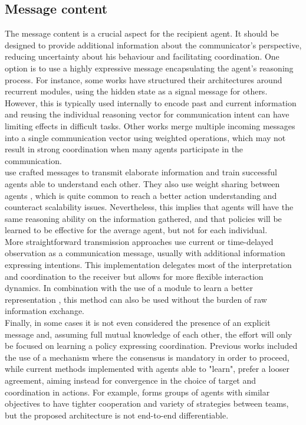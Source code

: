 \documentclass[a4paper,singleside,12pt]{report} %
\begin{document}
\subsection{Message content}\label{message-content}
The message content is a crucial aspect for the recipient agent. It should be designed to provide additional information about the communicator's perspective, reducing uncertainty about his behaviour and facilitating coordination. One option is to use a highly expressive message encapsulating the agent's reasoning process. For instance, some works \cite{Sukhbaatar2016LearningMC, IC3NETSingh2018LearningWT, Das2018TarMACTM, Peng2017MultiagentBN} have structured their architectures around recurrent modules, using the hidden state as a signal message for others. However, this is typically used internally to encode past and current information and reusing the individual reasoning vector for communication intent can have limiting effects in difficult tasks. Other works \cite{Sukhbaatar2016LearningMC, IC3NETSingh2018LearningWT} merge multiple incoming messages into a single communication vector using weighted operations, which may not result in strong coordination when many agents participate in the communication.\\
\cite{Das2018TarMACTM, ATOCJiang2018LearningAC} use crafted messages to transmit elaborate information and train successful agents able to understand each other. They also use weight sharing between agents \cite{Kim2021CommunicationIM, Das2018TarMACTM, Peng2017MultiagentBN, ATOCJiang2018LearningAC}, which is quite common to reach a better action understanding and counteract scalability issues. Nevertheless, this implies that agents will have the same reasoning ability on the information gathered, and that policies will be learned to be effective for the average agent, but not for each individual.\\
More straightforward transmission approaches \cite{Liu2020When2comMP, Kim2021CommunicationIM} use current or time-delayed observation as a communication message, usually with additional information expressing intentions. This implementation delegates most of the interpretation and coordination to the receiver but allows for more flexible interaction dynamics. In combination with the use of a module to learn a better representation \cite{Lin2021LearningTG}, this method can also be used without the burden of raw information exchange.\\
Finally, in some cases it is not even considered the presence of an explicit message and, assuming full mutual knowledge of each other, the effort will only be focused on learning a policy expressing coordination. Previous works \cite{Ren2005ConsensusSI, OlfatiSaber2007ConsensusAC} included the use of a mechanism where the consensus is mandatory in order to proceed, while current methods implemented with agents able to "learn", prefer a looser agreement, aiming instead for convergence in the choice of target and coordination in actions. For example, \cite{Li2021StructuredDE} forms groups of agents with similar objectives to have tighter cooperation and variety of strategies between teams, but the proposed architecture is not end-to-end differentiable.\\
\end{document}
